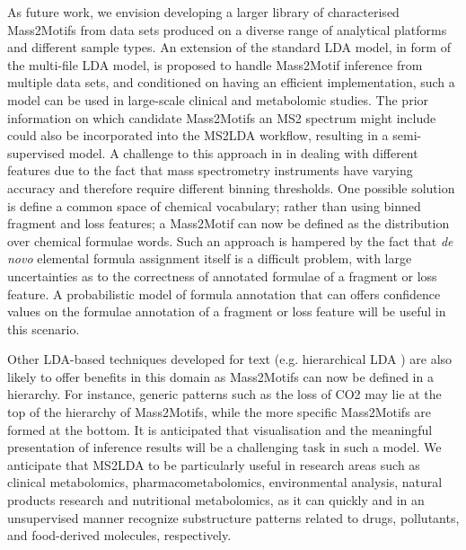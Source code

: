 As future work, we envision developing a larger library of characterised Mass2Motifs from data sets produced on a diverse range of analytical platforms and different sample types. An extension of the standard LDA model, in form of the multi-file LDA model, is proposed to handle Mass2Motif inference from multiple data sets, and conditioned on having an efficient implementation, such a model can be used in large-scale clinical and metabolomic studies. The prior information on which candidate Mass2Motifs an MS2 spectrum might include could also be incorporated into the MS2LDA workflow, resulting in a semi-supervised model. A challenge to this approach in in dealing with different features due to the fact that mass spectrometry instruments have varying accuracy and therefore require different binning thresholds. One possible solution is define a common space of chemical vocabulary; rather than using binned fragment and loss features; a Mass2Motif can now be defined as the distribution over chemical formulae words. Such an approach is hampered by the fact that \textit{de novo} elemental formula assignment itself is a difficult problem, with large uncertainties as to the correctness of annotated formulae of a fragment or loss feature. A probabilistic model of formula annotation that can offers confidence values on the formulae annotation of a fragment or loss feature will be useful in this scenario.

Other LDA-based techniques developed for text (e.g. hierarchical LDA \cite{griffiths2004hierarchical}) are also likely to offer benefits in this domain as Mass2Motifs can now be defined in a hierarchy. For instance, generic patterns such as the loss of CO2 may lie at the top of the hierarchy of Mass2Motifs, while the more specific Mass2Motifs are formed at the bottom. It is anticipated that visualisation and the meaningful presentation of inference results will be a challenging task in such a model. We anticipate that MS2LDA to be particularly useful in research areas such as clinical metabolomics, pharmacometabolomics, environmental analysis, natural products research and nutritional metabolomics, as it can quickly and in an unsupervised manner recognize substructure patterns related to drugs, pollutants, and food-derived molecules, respectively. 
